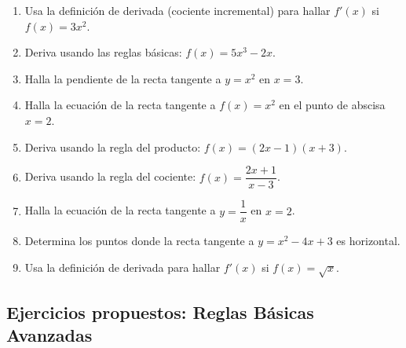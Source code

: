 \documentclass[12pt, letterpaper]{article}
\begin{document}
\begin{enumerate}[resume=ejercicios, leftmargin=*]
  \item \facil{} Usa la definición de derivada (cociente incremental) para hallar $f'(x)$ si $f(x) = 3x^2$.

  \item \facil{} Deriva usando las reglas básicas: $f(x) = 5x^3 - 2x$.

  \item \medio{} Halla la pendiente de la recta tangente a $y = x^2$ en $x = 3$.

  \item \medio{} Halla la ecuación de la recta tangente a $f(x) = x^2$ en el punto de abscisa $x = 2$.

  \item \medio{} Deriva usando la regla del producto: $f(x) = (2x - 1)(x + 3)$.

  \item \dificil{} Deriva usando la regla del cociente: $f(x) = \dfrac{2x + 1}{x - 3}$.

  \item \dificil{} Halla la ecuación de la recta tangente a $y = \dfrac{1}{x}$ en $x = 2$.

  \item \dificil{} Determina los puntos donde la recta tangente a $y = x^2 - 4x + 3$ es horizontal.

  \item \muyDificil{} Usa la definición de derivada para hallar $f'(x)$ si $f(x) = \sqrt{x}$.
\end{enumerate}

\subsection{Ejercicios propuestos: Reglas Básicas Avanzadas}
\end{document}
